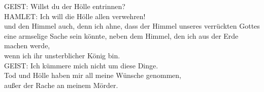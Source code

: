 {\begin{playdialog}
GEIST: Willst du der Hölle entrinnen?\\

HAMLET: Ich will die Hölle allen verwehren!\\
und den Himmel auch, denn ich ahne, dass der Himmel unseres verrückten Gottes\\
eine armselige Sache sein könnte, neben dem Himmel, den ich aus der Erde machen werde,\\
wenn ich ihr unsterblicher König bin.\\


GEIST: Ich kümmere mich nicht um diese Dinge.\\
Tod und Hölle haben mir all meine Wünsche genommen,\\
außer der Rache an meinem Mörder.\\


\end{playdialog}}
